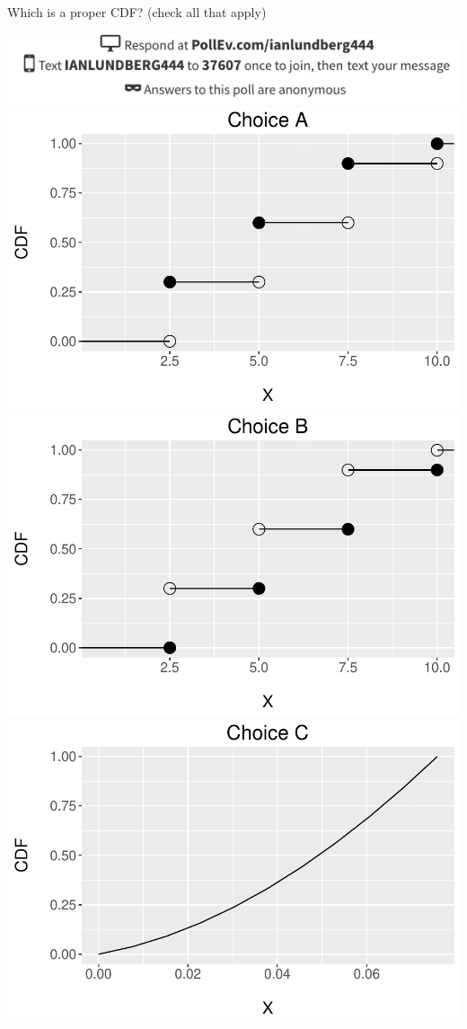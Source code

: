 \documentclass{beamer}
\begin{document}
\begin{frame}{Which is a proper CDF? (check all that apply)}
\begin{center}
\includegraphics[scale=.4]{figures/Bullseye_Poll.png} \\
\includegraphics[scale=.32]{figures/CDF1.pdf}
\includegraphics[scale=.32]{figures/CDF2.pdf} \\
\includegraphics[scale=.32]{figures/CDF3.pdf}

\end{center}
\end{frame}
\end{document}
